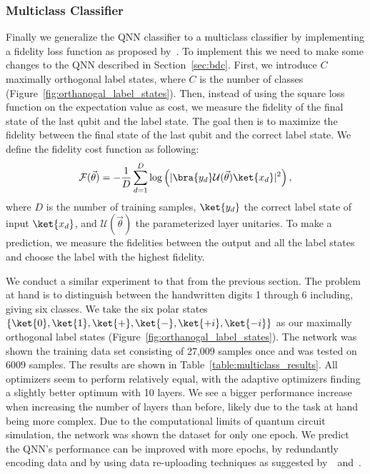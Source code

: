 \documentclass[a4paper,10pt]{article}
\begin{document}
\subsubsection{Multiclass Classifier} \label{sec:multiclass_classifier}
Finally we generalize the QNN classifier to a multiclass classifier by implementing a fidelity loss function as proposed by~\textcite{perez2019data}.
To implement this we need to make some changes to the QNN described in Section~\ref{sec:bdc}.
First, we introduce $C$ maximally orthogonal label states, where $C$ is the number of classes (Figure~\ref{fig:orthanogal_label_states}).
Then, instead of using the square loss function on the expectation value as cost, we measure the fidelity of the final state of the last qubit and the label state.
The goal then is to maximize the fidelity between the final state of the last qubit and the correct label state.
We define the fidelity cost function as following:
\begin{equation}
\mathcal{F}(\vec{\theta}) = - \dfrac{1}{D} \sum_{d=1}^{D} \log \left( \lvert \bra{y_d}\mathcal{U}(\vec{\theta})\ket{x_d} \rvert^2\right),
\end{equation}
where $D$ is the number of training samples, $\ket{y_d}$ the correct label state of input $\ket{x_d}$, and $\mathcal{U}(\vec{\theta})$ the parameterized layer unitaries.
To make a prediction, we measure the fidelities between the output and all the label states and choose the label with the highest fidelity.

We conduct a similar experiment to that from the previous section.
The problem at hand is to distinguish between the handwritten digits 1 through 6 including, giving six classes.
We take the six polar states $\{\ket{0}, \ket{1}, \ket{+}, \ket{-}, \ket{+i}, \ket{-i}\}$ as our maximally orthogonal label states (Figure~\ref{fig:orthanogal_label_states}).
The network was shown the training data set consisting of 27,009 samples once and was tested on 6009 samples.
The results are shown in Table~\ref{table:multiclass_results}.
All optimizers seem to perform relatively equal, with the adaptive optimizers finding a slightly better optimum with 10 layers.
We see a bigger performance increase when increasing the number of layers than before, likely due to the task at hand being more complex.
Due to the computational limits of quantum circuit simulation, the network was shown the dataset for only one epoch.
We predict the QNN's performance can be improved with more epochs, by redundantly encoding data and by using data re-uploading techniques as suggested by~\textcite{vidal2019input}~and~\textcite{perez2019data}.
\end{document}
